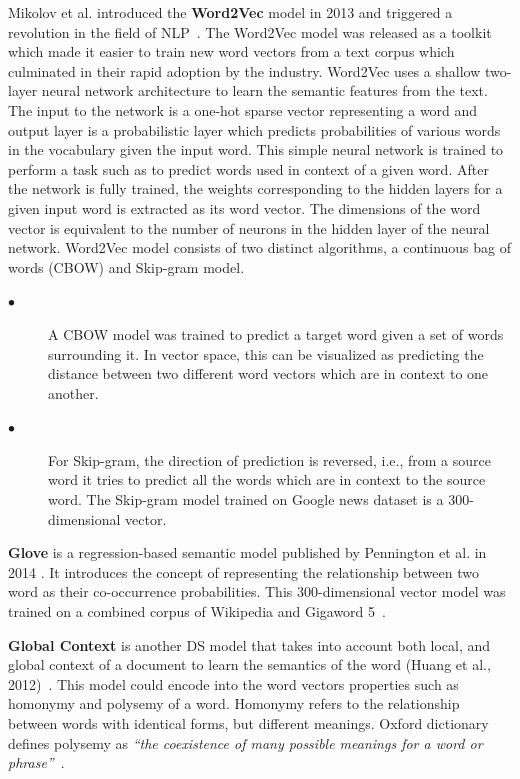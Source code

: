 Mikolov et al. introduced the \textbf{Word2Vec} model in 2013 and triggered
a revolution in the field of NLP~\cite{Word2Vec}. The
Word2Vec model was released as a toolkit which made it easier to train new word vectors from a text corpus which culminated in their rapid adoption by the industry.  Word2Vec uses a shallow two-layer neural network architecture to learn the semantic features from the text. The input to the network is a one-hot sparse vector representing a word and output layer is a probabilistic layer which predicts probabilities of various words in the vocabulary given the input word. This simple neural network is trained to perform a task such as to predict words used in context of a given word. After the network is fully trained, the weights corresponding to the hidden layers for a given input word is extracted as its word vector. The dimensions of the word vector is equivalent to the number of neurons in the hidden layer of the neural network. Word2Vec model consists of two distinct algorithms, a continuous bag
of words (CBOW) and Skip-gram model. 

\begin{description}
\item[$\bullet$]A CBOW model was
trained to predict a target word given a set of words
surrounding it. In vector space, this can be visualized as
predicting the distance between two different word vectors
which are in context to one another.
\item[$\bullet$]  For Skip-gram, the
direction of prediction is reversed, i.e., from a source word it tries to predict all the words which are in context to the source word. The Skip-gram model trained on Google
news dataset is a 300-dimensional vector.
\end{description}



\textbf{Glove} is a regression-based semantic model published by Pennington et al. in 2014 \cite{Glove}. It introduces the concept of representing the relationship between two word as their co-occurrence probabilities. This 300-dimensional vector model was trained on a combined corpus of Wikipedia and Gigaword 5~\cite{graff2003english}.

\textbf{Global Context} is another DS model that takes into account both local, and global context of a document to learn the semantics of the word (Huang et al., 2012)~\cite{GlobalContext}. This model could  encode into the word vectors properties such as homonymy and polysemy of a word. Homonymy refers to the relationship between words with identical forms, but different meanings. Oxford dictionary defines polysemy as \textit{``the coexistence of many possible meanings for a
word or phrase''}~\cite{simpson1989oxford}. 

